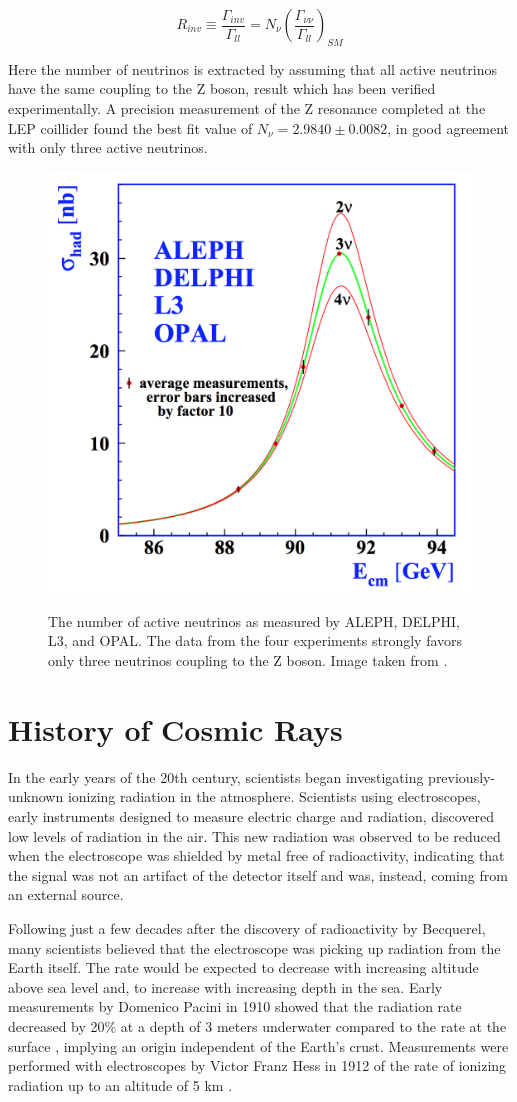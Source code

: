 \begin{equation}
	R_{inv} \equiv \frac{\Gamma_{inv}}{\Gamma_{ll}} = N_\nu \left( \frac{\Gamma_{\nu\nu}}{\Gamma_{ll}}\right)_{SM}
\end{equation}

Here the number of neutrinos is extracted by assuming that all active neutrinos have the same coupling to the Z boson, result which has been verified experimentally. 
A precision measurement of the Z resonance completed at the LEP coillider found the best fit value of $N_\nu = 2.9840 \pm 0.0082$, in good agreement with only three active neutrinos.

\begin{figure}
\centering
\includegraphics[width=0.5\linewidth]{ALEPH_NumNu.png} 
\label{fig:ALEPH}
\caption{The number of active neutrinos as measured by ALEPH, DELPHI, L3, and OPAL. The data from the four experiments strongly favors only three neutrinos coupling to the Z boson. Image taken from \cite{ALEPH-3Nu}.}
\end{figure}

\label{sec:cosmic_rays}
\section{History of Cosmic Rays}
In the early years of the 20th century, scientists began investigating previously-unknown ionizing radiation in the atmosphere.
Scientists using electroscopes, early instruments designed to measure electric charge and radiation, discovered low levels of radiation in the air.
This new radiation was observed to be reduced when the electroscope was shielded by metal free of radioactivity, indicating that the signal was not an artifact of the detector itself and was, instead, coming from an external source.

Following just a few decades after the discovery of radioactivity by Becquerel, many scientists believed that the electroscope was picking up radiation from the Earth itself.
The rate would be expected to decrease with increasing altitude above sea level and, to increase with increasing depth in the sea.
Early measurements by Domenico Pacini in 1910 showed that the radiation rate decreased by 20\% at a depth of 3 meters underwater compared to the rate at the surface \cite{Pacini-CRSource}, implying an origin independent of the Earth's crust.
Measurements were performed with electroscopes by Victor Franz Hess in 1912 of the rate of ionizing radiation up to an altitude of 5 km \cite{Hoerandel-CRHistory}.

